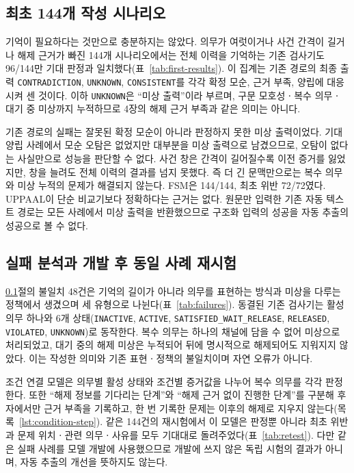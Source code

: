 \begin{revision}
\subsection{최초 144개 작성 시나리오}
\label{sec:first-results}
기억이 필요하다는 것만으로 충분하지는 않았다. 의무가 여럿이거나 사건 간격이 길거나 해제 근거가 빠진 144개 시나리오에서는 전체 이력을 기억하는 기존 검사기도 96/144만 기대 판정과 일치했다(표~\ref{tab:first-results}). 이 집계는 기존 경로의 최종 출력 \texttt{CONTRADICTION}, \texttt{UNKNOWN}, \texttt{CONSISTENT}를 각각 확정 모순, 근거 부족, 양립에 대응시켜 센 것이다. 이하 \texttt{UNKNOWN}은 ``미상 출력''이라 부르며, 구문 모호성ㆍ복수 의무ㆍ대기 중 미상까지 누적하므로 4장의 해제 근거 부족과 같은 의미는 아니다.



기존 경로의 실패는 잘못된 확정 모순이 아니라 판정하지 못한 미상 출력이었다. 기대 양립 사례에서 모순 오탐은 없었지만 대부분을 미상 출력으로 남겼으므로, 오탐이 없다는 사실만으로 성능을 판단할 수 없다. 사건 창은 간격이 길어질수록 이전 증거를 잃었지만, 창을 늘려도 전체 이력의 결과를 넘지 못했다. 즉 더 긴 문맥만으로는 복수 의무와 미상 누적의 문제가 해결되지 않는다. FSM은 144/144, 최초 위반 72/72였다. UPPAAL이 단순 비교기보다 정확하다는 근거는 없다. 원문만 입력한 기존 자동 텍스트 경로는 모든 사례에서 미상 출력을 반환했으므로 구조화 입력의 성공을 자동 추출의 성공으로 볼 수 없다.

\subsection{실패 분석과 개발 후 동일 사례 재시험}
\label{sec:retest-results}
\ref{sec:first-results}절의 불일치 48건은 기억의 길이가 아니라 의무를 표현하는 방식과 미상을 다루는 정책에서 생겼으며 세 유형으로 나뉜다(표~\ref{tab:failures}). 동결된 기존 검사기는 활성 의무 하나와 6개 상태(\texttt{INACTIVE}, \texttt{ACTIVE}, \texttt{SATISFIED\_WAIT\_RELEASE}, \texttt{RELEASED}, \texttt{VIOLATED}, \texttt{UNKNOWN})로 동작한다. 복수 의무는 하나의 채널에 담을 수 없어 미상으로 처리되었고, 대기 중의 해제 미상은 누적되어 뒤에 명시적으로 해제되어도 지워지지 않았다. 이는 작성한 의미와 기존 표현ㆍ정책의 불일치이며 자연 오류가 아니다.

조건 연결 모델은 의무별 활성 상태와 조건별 증거값을 나누어 복수 의무를 각각 판정한다. 또한 ``해제 정보를 기다리는 단계''와 ``해제 근거 없이 진행한 단계''를 구분해 후자에서만 근거 부족을 기록하고, 한 번 기록한 문제는 이후의 해제로 지우지 않는다(목록~\ref{lst:condition-step}). 같은 144건의 재시험에서 이 모델은 판정뿐 아니라 최초 위반과 문제 위치ㆍ관련 의무ㆍ사유를 모두 기대대로 돌려주었다(표~\ref{tab:retest}). 다만 같은 실패 사례를 모델 개발에 사용했으므로 개발에 쓰지 않은 독립 시험의 결과가 아니며, 자동 추출의 개선을 뜻하지도 않는다.


\end{revision}
